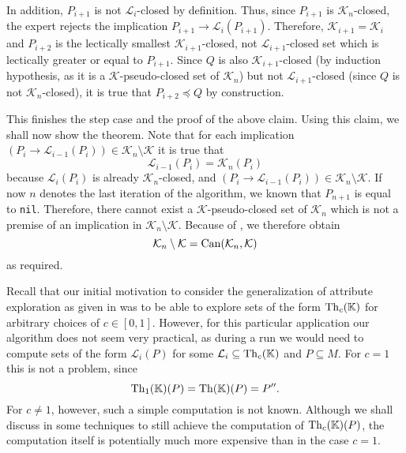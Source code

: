 \begin{Proof}
  In addition, $P_{i+1}$ is not $\mathcal{L}_{i}$-closed by definition.  Thus, since
  $P_{i+1}$ is $\mathcal{K}_{n}$-closed, the expert rejects the implication $P_{i+1} \to
  \mathcal{L}_{i}(P_{i+1})$.  Therefore, $\mathcal{K}_{i+1} = \mathcal{K}_{i}$ and
  $P_{i+2}$ is the lectically smallest $\mathcal{K}_{i+1}$-closed, not
  $\mathcal{L}_{i+1}$-closed set which is lectically greater or equal to $P_{i+1}$.  Since
  $Q$ is also $\mathcal{K}_{i+1}$-closed (by induction hypothesis, as it is a
  $\mathcal{K}$-pseudo-closed set of $\mathcal{K}_{n}$) but not $\mathcal{L}_{i+1}$-closed
  (since $Q$ is not $\mathcal{K}_{n}$-closed), it is true that $P_{i+2} \preceq Q$ by
  construction.

  This finishes the step case and the proof of the above claim.  Using this claim, we
  shall now show the theorem.  Note that for each implication $(P_{i} \to
  \mathcal{L}_{i-1}(P_{i})) \in \mathcal{K}_{n} \setminus \mathcal{K}$ it is true that
  \begin{equation}
    \label{eq:38}
    \mathcal{L}_{i-1}(P_{i}) = \mathcal{K}_{n}(P_{i})
  \end{equation}
  because $\mathcal{L}_{i}(P_{i})$ is already $\mathcal{K}_{n}$-closed, and $(P_{i} \to
  \mathcal{L}_{i-1}(P_{i})) \in \mathcal{K}_{n} \setminus \mathcal{K}$.  If now $n$
  denotes the last iteration of the algorithm, we known that $P_{n+1}$ is equal to
  \lstinline{nil}.  Therefore, there cannot exist a $\mathcal{K}$-pseudo-closed set of
  $\mathcal{K}_{n}$ which is not a premise of an implication in $\mathcal{K}_{n} \setminus
  \mathcal{K}$.  Because of , we therefore obtain
  \begin{equation*}
    \mathcal{K}_{n} \setminus \mathcal{K} = \operatorname{Can}(\mathcal{K}_{n}, \mathcal{K})
  \end{equation*}
  as required.
\end{Proof}

Recall that our initial motivation to consider the generalization of attribute exploration
as given in  was to be able to explore sets of the form
$\operatorname{Th}_{c}({\mathbb{K}})$ for arbitrary choices of $c \in [0,1]$.  However, for this particular
application our algorithm does not seem very practical, as during a run we would need to
compute sets of the form $\mathcal{L}_{i}(P)$ for some $\mathcal{L}_{i} \subseteq
\operatorname{Th}_{c}({\mathbb{K}})$ and $P \subseteq M$.  For $c = 1$ this is not a problem, since
\begin{equation*}
  \operatorname{Th}_{1}({\mathbb{K}})(P) = \operatorname{Th}({\mathbb{K}})(P) = P''.
\end{equation*}
For $c \neq 1$, however, such a simple computation is not known.  Although we shall
discuss in  some techniques to still achieve the computation of
$\operatorname{Th}_{c}({\mathbb{K}})(P)$, the computation itself is potentially much more expensive than in
the case $c = 1$.

